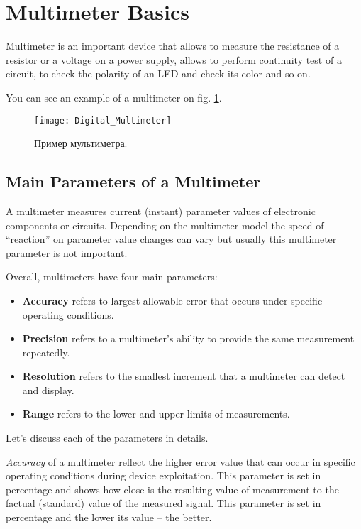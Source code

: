 \documentclass[../main.tex]{subfiles}
\begin{document}
\section{Multimeter Basics}

Multimeter is an important device that allows to measure the resistance of a
resistor or a voltage on a power supply, allows to perform continuity test of a
circuit, to check the polarity of an LED and check its color and so on.

You can see an example of a multimeter on fig. \ref{fig:multimeter-example}.

\begin{figure}[ht]
  \centering
  \texttt{[image: Digital\_Multimeter]}
  \caption{Пример мультиметра.}
  \label{fig:multimeter-example}
\end{figure}

\subsection{Main Parameters of a Multimeter}

A multimeter measures current (instant) parameter values of electronic
components or circuits.  Depending on the multimeter model the speed of
``reaction'' on parameter value changes can vary but usually this multimeter
parameter is not important.

Overall, multimeters have four\cite{fluke:multimeter} main parameters:
\begin{itemize}
\item \textbf{Accuracy} refers to largest allowable error that occurs under
  specific operating conditions.
\item \textbf{Precision} refers to a multimeter's ability to provide the same
  measurement repeatedly.
\item \textbf{Resolution} refers to the smallest increment that a multimeter can
  detect and display.
\item \textbf{Range} refers to the lower and upper limits of measurements.
\end{itemize}

Let's discuss each of the parameters in details.

\emph{Accuracy} of a multimeter reflect the higher error value that can occur in
specific operating conditions during device exploitation.  This parameter is set
in percentage and shows how close is the resulting value of measurement to the
factual (standard) value of the measured signal.  This parameter is set in
percentage and the lower its value -- the better.
\end{document}
